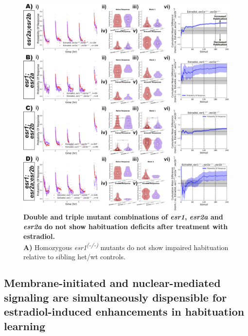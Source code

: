\documentclass[9pt,lineno]{RandlettLab_elife}
\begin{document}
{\begin{figure}
\begin{fullwidth}
\begin{center}
\includegraphics[width=0.95\linewidth]{figures/NuclearDoubleAndTripleMutants.png}
\caption{ \textbf{Double and triple mutant combinations of \emph{esr1}, \emph{esr2a} and \emph{esr2a} do not show habituation deficits after treatment with estradiol.}
\\ \textbf{A)} Homozygous \emph{esr1\textsuperscript{(-/-)}} mutants do not show impaired habituation relative to sibling het/wt controls. 
}
\label{fig:4}

\end{center}
\end{fullwidth}
\end{figure}

\subsection{Membrane-initiated and nuclear-mediated signaling are simultaneously dispensible for estradiol-induced enhancements in habituation learning}

}
\end{document}
